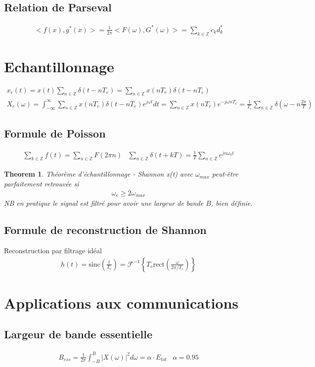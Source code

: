 \documentclass[a4paper]{amsart}
\newtheorem{myTheorem}{Theorem}
\begin{document}
\subsection{Relation de Parseval}
\begin{eqnarray}
	<f(x),g^*(x)>=\frac{1}{2\pi}<F(\omega),G^*(\omega)>=\sum_{k\in\mathbb{Z}}c_kd_k^*
\end{eqnarray}
\section{Echantillonnage}
\begin{eqnarray}
	x_e(t)=x(t)\sum_{n\in\mathbb Z}\delta(t-nT_e)=\sum_{n\in\mathbb Z}x(nT_e)\delta(t-nT_e)\\
	X_e(\omega)=\int_{-\infty}^{\infty}\sum_{n\in\mathbb Z}x(nT_e)\delta(t-nT_e)e^{j\omega t}dt=\sum_{n\in\mathbb Z}x(nT_e)e^{-j\omega nT_e}=\frac{1}{T_e}\sum_{n\in\mathbb Z}\delta(\omega-n\frac{2\pi}{T})
\end{eqnarray}
\subsection{Formule de Poisson}
\begin{eqnarray}
	\sum_{k\in\mathbb Z}f(t)=\sum_{n\in\mathbb Z}F(2\pi n)&\sum_{n\in\mathbb Z}\delta(t+kT)=\frac{1}{T}\sum_{n\in\mathbb Z}e^{jn\omega_0t}
\end{eqnarray}
\begin{myTheorem}{Théorème d'échantillonnage - Shannon}
	x(t) avec $\omega_{max}$ peut-être parfaitement retrouvée si
	\begin{eqnarray}
		\omega_e\geq2\omega_{max}
	\end{eqnarray}
	NB en pratique le signal est filtré pour avoir une largeur de bande $B$, bien définie.
\end{myTheorem}
\subsection{Formule de reconstruction de Shannon}
Reconstruction par filtrage idéal
\begin{eqnarray}
	h(t)=\mathrm{sinc}(\frac{t}{T_e})=\mathcal{F}^{-1}\left\{T_e\mathrm{rect}\left(\frac{\omega}{2\pi/T_e}\right)\right\}
\end{eqnarray}
\section{Applications aux communications}
\subsection{Largeur de bande essentielle}
\begin{eqnarray}
	B_{ess}=\frac{1}{2\pi}\int_{-B}^B|X(\omega)|^2d\omega=\alpha\cdot E_{tot}&\alpha=0.95
\end{eqnarray}
\end{document}
